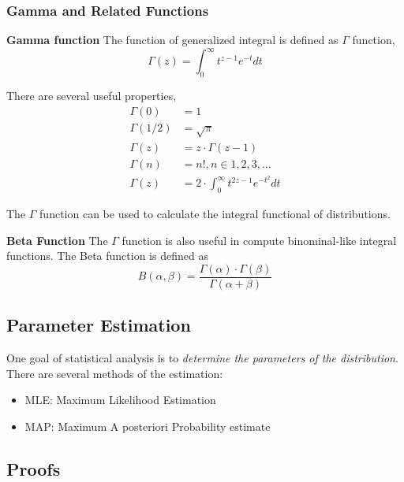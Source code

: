 \documentclass[./main.tex]{subfiles}
\begin{document}
\subsubsection{Gamma and Related Functions}
\textbf{Gamma function}
The function of generalized integral is defined as $\Gamma$ function,
\begin{equation}
    \label{Definition: Gamma function}
    \Gamma(z) = \int_{0}^{\infty} t^{z-1} e^{-t} dt
\end{equation}

There are several useful properties,
\begin{equation}
    \label{Property: Gamma function}
    \begin{split}
        \Gamma(0) & = 1 \\
        \Gamma(1/2) & = \sqrt{\pi} \\
        \Gamma(z) & = z \cdot \Gamma(z-1) \\
        \Gamma(n) & = n!, n \in {1, 2, 3, \dots} \\
        \Gamma(z) & = 2 \cdot \int_{0}^{\infty} t^{2z-1} e^{-t^2} dt
    \end{split}
\end{equation}

The $\Gamma$ function can be used to calculate the integral functional of distributions.

\textbf{Beta Function}
The $\Gamma$ function is also useful in compute binominal-like integral functions.
The Beta function is defined as
\begin{equation}
    \label{Definition: Beta Function}
    B(\alpha, \beta) = \frac{\Gamma(\alpha) \cdot \Gamma(\beta)}{\Gamma(\alpha + \beta)}
\end{equation}

\subsection{Parameter Estimation}
One goal of statistical analysis is to \emph{determine the parameters of the distribution}.
There are several methods of the estimation:
\begin{itemize}
    \item MLE: Maximum Likelihood Estimation
    \item MAP: Maximum A posteriori Probability estimate
\end{itemize}

\begin{subappendices}

    \subsection{Proofs}
    
    
    

\end{subappendices}
\end{document}
